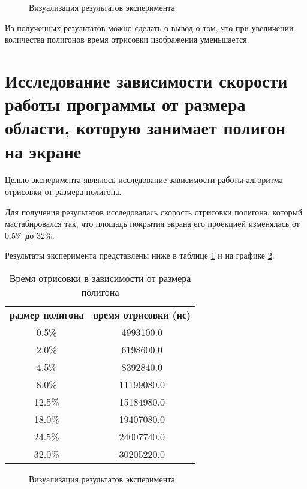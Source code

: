 \begin{figure}[H]
	\caption{Визуализация результатов эксперимента}
	\label{fig:exp_1_res}
\end{figure}

Из полученных результатов можно сделать о вывод о том, что при увеличении количества полигонов время отрисовки изображения уменьшается.

\section{Исследование зависимости скорости работы программы от размера области, которую занимает полигон на экране}
Целью эксперимента являлось исследование зависимости работы алгоритма отрисовки от размера полигона. 

Для получения результатов исследовалась скорость отрисовки полигона, который мастабировался так, что площадь покрытия экрана его проекцией изменялась от 0.5\% до 32\%.

Результаты эксперимента представлены ниже в таблице \ref{tab:res_2} и на графике \ref{fig:exp_2_res}.

\begin{table}[H]
  \begin{center}
    \captionsetup{justification=raggedright}
     \caption{Время отрисовки в зависимости от размера полигона}
    \label{tab:res_2}
    \begin{tabular}{c|c}
      \textbf{размер полигона} & \textbf{время отрисовки (нс)}\\
	0.5\% & 4993100.0\\
	2.0\% & 6198600.0\\
	4.5\% & 8392840.0\\
	8.0\% & 11199080.0\\
	12.5\% & 15184980.0\\
	18.0\% & 19407080.0\\
	24.5\% & 24007740.0\\
	32.0\% & 30205220.0\\
      \hline	
    \end{tabular}
  \end{center}
\end{table}

\begin{figure}[H]
	\caption{Визуализация результатов эксперимента}
	\label{fig:exp_2_res}
\end{figure}


